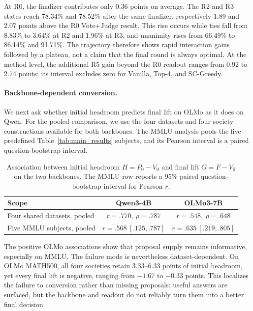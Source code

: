 At R0, the finalizer contributes only 0.36 points on average. The R2 and R3
states reach 78.34\% and 78.52\% after the same finalizer, respectively 1.89
and 2.07 points above the R0 Vote+Judge result. This rise occurs while ties
fall from 8.83\% to 3.64\% at R2 and 1.96\% at R3, and unanimity rises from
66.49\% to 86.14\% and 91.71\%. The trajectory therefore shows rapid
interaction gains followed by a plateau, not a claim that the final round is
always optimal. At the method level, the additional R5 gain beyond the R0
readout ranges from 0.92 to 2.74 points; its interval excludes zero for
Vanilla, Top-4, and SC-Greedy.

\paragraph{Backbone-dependent conversion.}
We next ask whether initial headroom predicts final lift on OLMo as it does on
Qwen. For the pooled comparison, we use the four datasets and four society
constructions available for both backbones. The MMLU analysis pools the five
predefined Table~\ref{tab:main_results} subjects, and its Pearson interval is a
paired question-bootstrap interval.

\begin{table}[H]
\centering
\caption{Association between initial headroom $H=P_0-V_0$ and final lift
$G=F-V_0$ on the two backbones. The MMLU row reports a 95\% paired
question-bootstrap interval for Pearson $r$.}
\label{tab:backbone_headroom_conversion}
\small
\begin{tabular}{lcc}
\toprule
Scope & Qwen3-4B & OLMo3-7B \\
\midrule
Four shared datasets, pooled & $r=.770,\ \rho=.787$ & $r=.548,\ \rho=.648$ \\
Five MMLU subjects, pooled & $r=.568\ [.125,.787]$ & $r=.635\ [.219,.805]$ \\
\bottomrule
\end{tabular}
\end{table}

The positive OLMo associations show that proposal supply remains informative,
especially on MMLU. The failure mode is nevertheless dataset-dependent. On
OLMo MATH500, all four societies retain 3.33--6.33 points of initial headroom,
yet every final lift is negative, ranging from $-1.67$ to $-0.33$ points. This
localizes the failure to conversion rather than missing proposals: useful
answers are surfaced, but the backbone and readout do not reliably turn them
into a better final decision.

